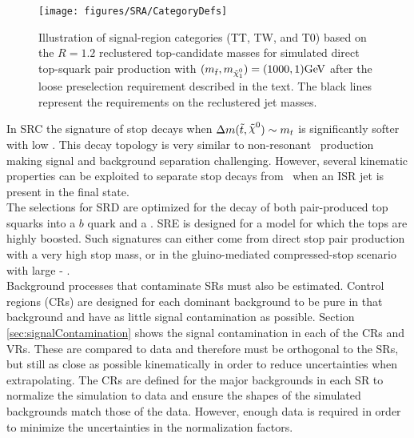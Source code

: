 \begin{figure}[t]
  \begin{center}
    \texttt{[image: figures/SRA/CategoryDefs]}
    \caption[Top quark mass categories.]{Illustration of signal-region categories (TT, TW, and T0) based on the $R=1.2$ reclustered top-candidate masses for simulated direct top-squark pair production with $(m_{\stop},m_{\ninoone})=(1000,1) \GeV$ after the loose preselection requirement described in the text. The black lines represent the requirements on the reclustered jet masses.}
    \label{fig:categories}
  \end{center}
\end{figure}

In SRC the signature of stop decays when $\Delta m(\stop,\LSP)\sim m_{t}$ is significantly softer with low \met. This decay topology is very similar to non-resonant \ttbar\ production making signal and background separation challenging. However, several kinematic properties can be exploited to separate stop decays from \ttbar\ when an ISR jet is present in the final state. \\

The selections for SRD are optimized for the decay of both pair-produced top squarks into a $b$ quark and a \chinoonepm. SRE is designed for a model for which the tops are highly boosted. Such signatures can either come from direct stop pair production with a very high stop mass, or in the gluino-mediated compressed-stop scenario with large \mgluino - \mstop. \\


Background processes that contaminate SRs must also be estimated.  Control regions (CRs) are designed for each dominant background to be pure in that background and have as little signal contamination as possible.  Section \ref{sec:signalContamination} shows the signal contamination in each of the CRs and VRs.  These are compared to data and therefore must be orthogonal to the SRs, but still as close as possible kinematically in order to reduce uncertainties when extrapolating.  The CRs are defined for the major backgrounds in each SR to normalize the simulation to data and ensure the shapes of the simulated backgrounds match those of the data.  However, enough data is required in order to minimize the uncertainties in the normalization factors. \\

